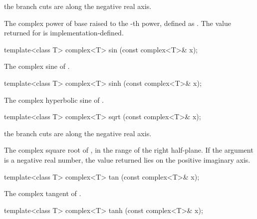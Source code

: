 \begin{itemdescr}
\pnum
\notes
the branch cuts are along the negative real axis.

\pnum
\returns
The complex power of base  raised to the -th power,
defined as
.
The value returned for
is implementation-defined.
\end{itemdescr}

%
\begin{itemdecl}
template<class T> complex<T> sin  (const complex<T>& x);
\end{itemdecl}

\begin{itemdescr}
\pnum
\returns
The complex sine of .
\end{itemdescr}

%
\begin{itemdecl}
template<class T> complex<T> sinh (const complex<T>& x);
\end{itemdecl}

\begin{itemdescr}
\pnum
\returns
The complex hyperbolic sine of .
\end{itemdescr}

%
\begin{itemdecl}
template<class T> complex<T> sqrt (const complex<T>& x);
\end{itemdecl}

\begin{itemdescr}
\pnum
\notes
the branch cuts are along the negative real axis.

\pnum
\returns
The complex square root of , in the range of the right
half-plane.
If the argument is a negative real number, the
value returned lies on the positive imaginary axis.
\end{itemdescr}

%
\begin{itemdecl}
template<class T> complex<T> tan  (const complex<T>& x);
\end{itemdecl}

\begin{itemdescr}
\pnum
\returns
The complex tangent of .
\end{itemdescr}

%
\begin{itemdecl}
template<class T> complex<T> tanh (const complex<T>& x);
\end{itemdecl}

